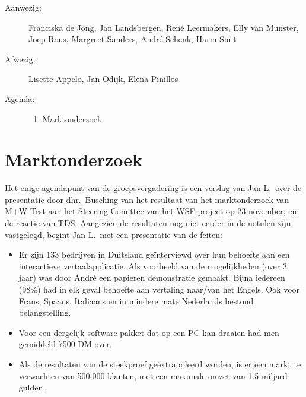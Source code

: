 

   \RosSupersedes{-}
   \MakeRosTitle
%
%
\begin{description}
\item[Aanwezig:] Franciska de Jong, 
                 Jan Landsbergen, Ren\'{e} Leermakers, 
                 Elly van Munster, 
                 Joep Rous, Margreet Sanders,
                 Andr\'{e} Schenk, Harm Smit
\item[Afwezig:] Lisette Appelo, Jan Odijk, Elena Pinillos
\item[Agenda:]\mbox{}
  \begin{enumerate}
  \item Marktonderzoek 
  \end{enumerate}
\end{description}


\section{Marktonderzoek}
Het enige agendapunt van de groepsvergadering is een verslag van Jan L.\ over 
de presentatie door dhr.\ Busching van het 
resultaat van het marktonderzoek van M+W Test aan het Steering Comittee 
van het WSF-project op 23 november, en de reactie van TDS. Aangezien de 
resultaten nog niet eerder in de notulen zijn vastgelegd, begint Jan L.\ met 
een presentatie van de feiten:
\begin{itemize}
\item Er zijn 133 bedrijven in Duitsland ge\"{i}nterviewd over hun behoefte aan 
een interactieve vertaalapplicatie. Als 
voorbeeld van de mogelijkheden (over 3 jaar) was 
door Andr\'{e} een papieren demonstratie gemaakt. Bijna iedereen (98\%) had in 
elk geval behoefte aan 
vertaling naar/van het Engels. Ook voor Frans, Spaans, Italiaans en in mindere 
mate Nederlands bestond belangstelling.
\item Voor een dergelijk software-pakket dat op een PC kan draaien had men 
gemiddeld 7500 DM over.
\item Als de resultaten van de steekproef ge\"{e}xtrapoleerd worden, is er een 
markt te verwachten van 500.000 klanten, met een maximale omzet van 1.5 miljard 
gulden.
\end{itemize}

